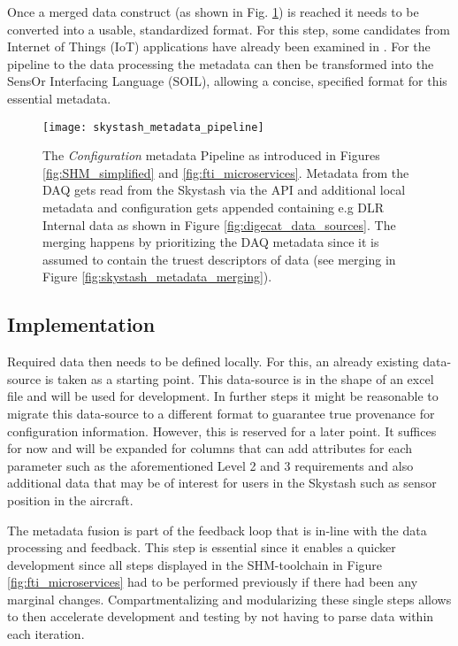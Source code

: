 Once a merged data construct (as shown in Fig. \ref{fig:skystash_metadata_pipeline}) is reached it needs to be converted into a usable, standardized format. For this step, some candidates from Internet of Things (IoT) applications have already been examined in \textcite{bodenbenner_model-driven_2022}. For the pipeline to the data processing the metadata can then be transformed into the SensOr Interfacing Language (SOIL), allowing a concise, specified format for this essential metadata.

\begin{figure}
    \centering
    \texttt{[image: skystash\_metadata\_pipeline]}
    \caption[The SHM Metadata Pipeline]{The \textit{Configuration} metadata Pipeline as introduced in Figures \ref{fig:SHM_simplified} and \ref{fig:fti_microservices}. Metadata from the DAQ gets read from the Skystash via the API and additional local metadata and configuration gets appended containing e.g DLR Internal data as shown in Figure \ref{fig:digecat_data_sources}. The merging happens by prioritizing the DAQ metadata since it is assumed to contain the truest descriptors of data (see merging in Figure \ref{fig:skystash_metadata_merging}). }
    \label{fig:skystash_metadata_pipeline}
\end{figure}

\subsection{Implementation}
Required data then needs to be defined locally. For this, an already existing data-source is taken as a starting point. This data-source is in the shape of an excel file and will be used for development. In further steps it might be reasonable to migrate this data-source to a different format to guarantee true provenance for configuration information. However, this is reserved for a later point. It suffices for now and will be expanded for columns that can add attributes for each parameter such as the aforementioned Level 2 and 3 requirements and also additional data that may be of interest for users in the Skystash such as sensor position in the aircraft.

The metadata fusion is part of the feedback loop that is in-line with the data processing and feedback. This step is essential since it enables a quicker development since all steps displayed in the SHM-toolchain in Figure \ref{fig:fti_microservices} had to be performed previously if there had been any marginal changes. Compartmentalizing and modularizing these single steps allows to then accelerate development and testing by not having to parse data within each iteration.


